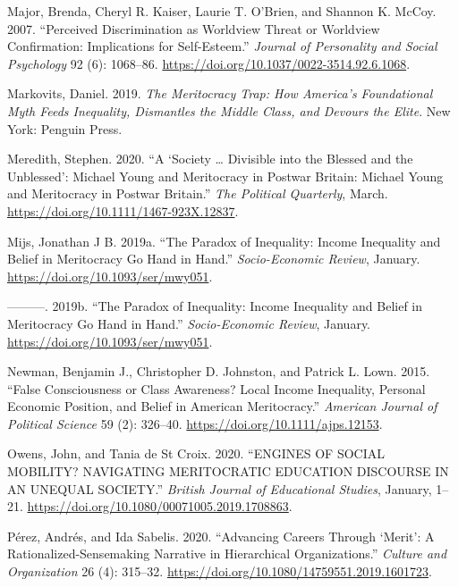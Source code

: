 \documentclass[
]{article}
\begin{document}
\leavevmode\hypertarget{ref-MajorPerceiveddiscriminationworldview2007}{}%
Major, Brenda, Cheryl R. Kaiser, Laurie T. O'Brien, and Shannon K.
McCoy. 2007. ``Perceived Discrimination as Worldview Threat or Worldview
Confirmation: Implications for Self-Esteem.'' \emph{Journal of
Personality and Social Psychology} 92 (6): 1068--86.
\url{https://doi.org/10.1037/0022-3514.92.6.1068}.

\leavevmode\hypertarget{ref-markovits_Meritocracy_2019}{}%
Markovits, Daniel. 2019. \emph{The Meritocracy Trap: How America's
Foundational Myth Feeds Inequality, Dismantles the Middle Class, and
Devours the Elite}. New York: Penguin Press.

\leavevmode\hypertarget{ref-Meredithsocietydivisibleblessed2020}{}%
Meredith, Stephen. 2020. ``A `Society \ldots{} Divisible into the
Blessed and the Unblessed': Michael Young and Meritocracy in Postwar
Britain: Michael Young and Meritocracy in Postwar Britain.'' \emph{The
Political Quarterly}, March.
\url{https://doi.org/10.1111/1467-923X.12837}.

\leavevmode\hypertarget{ref-MijsParadoxInequalityIncome2019b}{}%
Mijs, Jonathan J B. 2019a. ``The Paradox of Inequality: Income
Inequality and Belief in Meritocracy Go Hand in Hand.''
\emph{Socio-Economic Review}, January.
\url{https://doi.org/10.1093/ser/mwy051}.

\leavevmode\hypertarget{ref-mijs_paradox_2019}{}%
---------. 2019b. ``The Paradox of Inequality: Income Inequality and
Belief in Meritocracy Go Hand in Hand.'' \emph{Socio-Economic Review},
January. \url{https://doi.org/10.1093/ser/mwy051}.

\leavevmode\hypertarget{ref-newman_false_2015}{}%
Newman, Benjamin J., Christopher D. Johnston, and Patrick L. Lown. 2015.
``False Consciousness or Class Awareness? Local Income Inequality,
Personal Economic Position, and Belief in American Meritocracy.''
\emph{American Journal of Political Science} 59 (2): 326--40.
\url{https://doi.org/10.1111/ajps.12153}.

\leavevmode\hypertarget{ref-OwensENGINESSOCIALMOBILITY2020}{}%
Owens, John, and Tania de St Croix. 2020. ``ENGINES OF SOCIAL MOBILITY?
NAVIGATING MERITOCRATIC EDUCATION DISCOURSE IN AN UNEQUAL SOCIETY.''
\emph{British Journal of Educational Studies}, January, 1--21.
\url{https://doi.org/10.1080/00071005.2019.1708863}.

\leavevmode\hypertarget{ref-PerezAdvancingcareersmerit2020}{}%
Pérez, Andrés, and Ida Sabelis. 2020. ``Advancing Careers Through
`Merit': A Rationalized-Sensemaking Narrative in Hierarchical
Organizations.'' \emph{Culture and Organization} 26 (4): 315--32.
\url{https://doi.org/10.1080/14759551.2019.1601723}.
\end{document}
